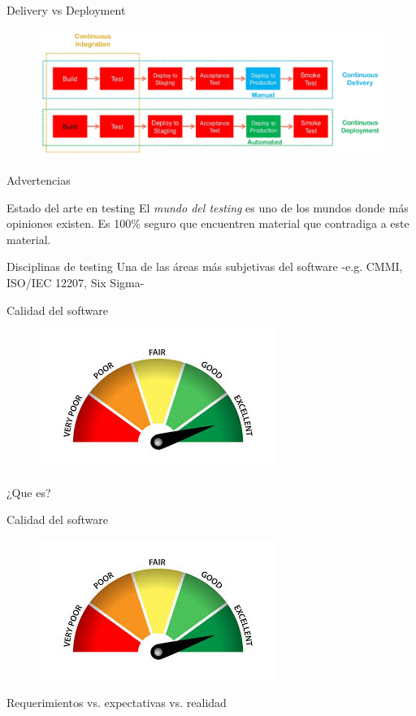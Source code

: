 \documentclass[aspectratio=169]{beamer}
\begin{document}
\begin{frame}{Delivery vs Deployment}
\begin{figure}
	\centering
	\includegraphics[width=\linewidth]{Images/etapa2}
	\label{fig:etapa2}
\end{figure}
\end{frame}

\begin{frame}{Advertencias}

\begin{alertblock}{Estado del arte en testing}
	El \textit{mundo del testing} es uno de los mundos donde más opiniones existen. Es 100\% seguro que encuentren material que contradiga a este material.
\end{alertblock}

\begin{alertblock}{Disciplinas de testing}
Una de las áreas más subjetivas del software -e.g. CMMI, ISO/IEC 12207, Six Sigma-
\end{alertblock}

\end{frame}


\begin{frame}{Calidad del software}
\begin{figure}
	\centering
	\includegraphics[width=0.6\linewidth]{Images/quality}
\end{figure}
¿Que es?
\end{frame}


\begin{frame}{Calidad del software}
\begin{figure}
	\centering
	\includegraphics[width=0.6\linewidth]{Images/quality}
\end{figure}
Requerimientos vs. expectativas vs. realidad
\end{frame}
\end{document}
